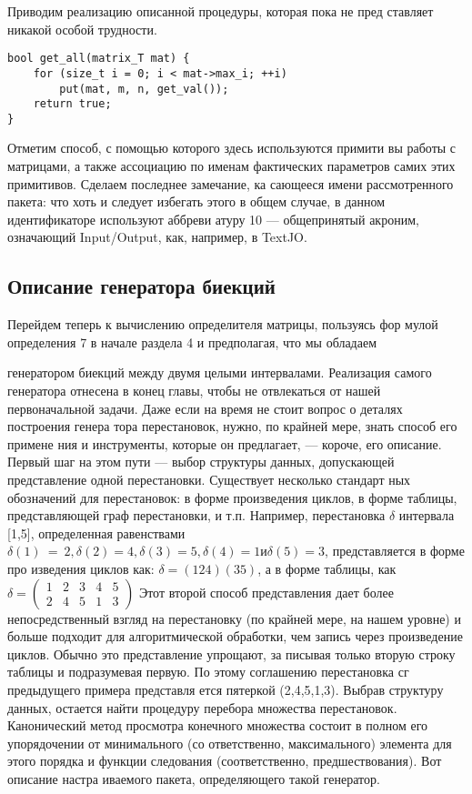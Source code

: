 \documentclass{../../template/mai_book}
\begin{document}
Приводим реализацию описанной процедуры, которая пока не пред­
ставляет никакой особой трудности.
\begin{lstlisting}
bool get_all(matrix_T mat) {
	for (size_t i = 0; i < mat->max_i; ++i)
		put(mat, m, n, get_val());
	return true;
}
\end{lstlisting}

Отметим способ, с помощью которого здесь используются примити­
вы работы с матрицами, а также ассоциацию по именам фактических
параметров самих этих примитивов. Сделаем последнее замечание, ка­
сающееся имени рассмотренного пакета: что хоть и следует избегать
этого в общем случае, в данном идентификаторе используют аббреви­
атуру 10 — общепринятый акроним, означающий Input/Output, как,
например, в TextJO.

\subsection{Описание генератора биекций}

Перейдем теперь к вычислению определителя матрицы, пользуясь фор­
мулой определения 7 в начале раздела 4 и предполагая, что мы обладаем

\newpage

генератором биекций между двумя целыми интервалами. Реализация
самого генератора отнесена в конец главы, чтобы не отвлекаться от
нашей первоначальной задачи.
Даже если на время не стоит вопрос о деталях построения генера­
тора перестановок, нужно, по крайней мере, знать способ его примене­
ния и инструменты, которые он предлагает, — короче, его описание.
Первый шаг на этом пути — выбор структуры данных, допускающей
представление одной перестановки. Существует несколько стандарт­
ных обозначений для перестановок: в форме произведения циклов, в
форме таблицы, представляющей граф перестановки, и т.п. Например,
перестановка $\delta$ интервала [1,5], определенная равенствами $\delta(1)~=~2,
\delta(2) = 4, \delta(3) = 5, \delta(4) = 1 и \delta(5) = 3$, представляется в форме про­
изведения циклов как: $\delta = ( 1 2 4 )( 3 5 )$, а в форме таблицы, как
$\delta = \begin{pmatrix} 1 & 2 & 3 & 4 & 5 \\ 2 & 4 & 5 & 1 & 3 \end{pmatrix} $
Этот второй способ представления дает более
непосредственный взгляд на перестановку (по крайней мере, на нашем
уровне) и больше подходит для алгоритмической обработки, чем запись
через произведение циклов. Обычно это представление упрощают, за­
писывая только вторую строку таблицы и подразумевая первую. По
этому соглашению перестановка сг предыдущего примера представля­
ется пятеркой (2,4,5,1,3).
Выбрав структуру данных, остается найти процедуру перебора
множества перестановок. Канонический метод просмотра конечного
множества состоит в полном его упорядочении от минимального (со­
ответственно, максимального) элемента для этого порядка и функции
следования (соответственно, предшествования). Вот описание настра­
иваемого пакета, определяющего такой генератор.
\end{document}
